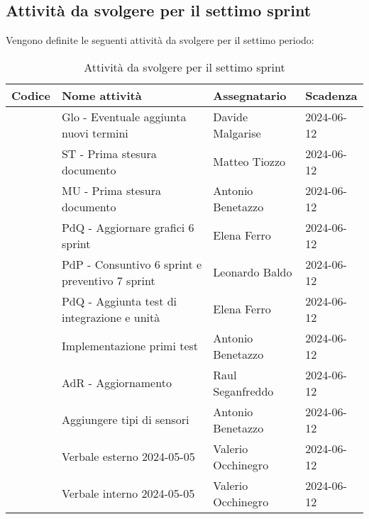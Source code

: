 \documentclass[italian,12pt]{article}
\begin{document}
\subsection{Attività da svolgere per il settimo sprint}
Vengono definite le seguenti attività da svolgere per il settimo periodo:
\begin{table}[!h]
	\centering
	\begin{tabular}{ |l||p{7cm}|l|l| }
		\hline
		\textbf{Codice}          & \textbf{Nome attività}                           & \textbf{Assegnatario} & \textbf{Scadenza} \\
		\hline
		\mySkip[86bz36wet]       & Glo - Eventuale aggiunta nuovi termini           & Davide Malgarise      & 2024-06-12        \\
		\mySkip[86bz36ugd]       & ST - Prima stesura documento                     & Matteo Tiozzo         & 2024-06-12        \\
		\mySkip[86bz36uee]       & MU - Prima stesura documento                     & Antonio Benetazzo     & 2024-06-12        \\
		\mySkip[86bz36u3g]       & PdQ - Aggiornare grafici 6 sprint                & Elena Ferro           & 2024-06-12        \\
		\mySkip[86bz36tuh]       & PdP - Consuntivo 6 sprint e preventivo 7 sprint  & Leonardo Baldo        & 2024-06-12        \\
		\mySkip[86bz36tj8]       & PdQ - Aggiunta test di integrazione e unità      & Elena Ferro           & 2024-06-12        \\
		\mySkip[86bz36p9v]       & Implementazione primi test                       & Antonio Benetazzo     & 2024-06-12        \\
		\mySkip[86bz36jf7]       & AdR - Aggiornamento                              & Raul Seganfreddo      & 2024-06-12        \\
		\mySkip[86bz36hj6]       & Aggiungere tipi di sensori                       & Antonio Benetazzo     & 2024-06-12        \\
		\mySkip[86bz36hgq]       & Verbale esterno 2024-05-05                       & Valerio Occhinegro    & 2024-06-12        \\
		\mySkip[86bz36h8r]       & Verbale interno 2024-05-05                       & Valerio Occhinegro    & 2024-06-12        \\
		\hline
	\end{tabular}
	\caption{Attività da svolgere per il settimo sprint}
\end{table}
\end{document}
